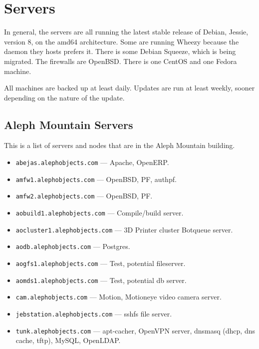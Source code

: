 %
%
%
%
%

\section{Servers}
In general, the servers are all running the latest stable release of Debian,
Jessie, version 8, on the amd64 architecture. Some are running Wheezy because
the daemon they hosts prefers it. There is some Debian Squeeze, which is being
migrated. The firewalls are OpenBSD. There is one CentOS and one Fedora
machine.

All machines are backed up at least daily. Updates are run at least weekly,
sooner depending on the nature of the update.

\subsection{Aleph Mountain Servers}
This is a list of servers and nodes that are in the Aleph Mountain building.

\begin{itemize}
\item \texttt{abejas.alephobjects.com} --- Apache, OpenERP.
\item \texttt{amfw1.alephobjects.com} --- OpenBSD, PF, authpf.
\item \texttt{amfw2.alephobjects.com} --- OpenBSD, PF.
\item \texttt{aobuild1.alephobjects.com} --- Compile/build server.
\item \texttt{aocluster1.alephobjects.com} --- 3D Printer cluster Botqueue
       server.
\item \texttt{aodb.alephobjects.com} --- Postgres.
\item \texttt{aogfs1.alephobjects.com} --- Test, potential fileserver.
\item \texttt{aomds1.alephobjects.com} --- Test, potential db server.
\item \texttt{cam.alephobjects.com} --- Motion, Motioneye video camera server.
\item \texttt{jebstation.alephobjects.com} --- sshfs file server.
\item \texttt{tunk.alephobjects.com} --- apt-cacher, OpenVPN server, dnsmasq
      (dhcp, dns cache, tftp), MySQL, OpenLDAP.
\end{itemize}

